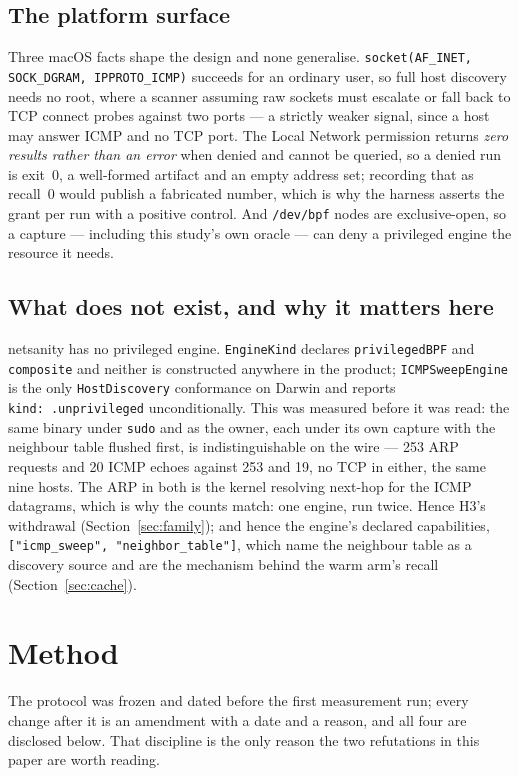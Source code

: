 \documentclass[conference]{IEEEtran}
\newcommand{\netsanity}{\textsf{netsanity}}
\begin{document}
\subsection{The platform surface}
Three macOS facts shape the design and none generalise.
\texttt{socket(AF\_INET, SOCK\_DGRAM, IP\-PROTO\_ICMP)} succeeds for an
ordinary user, so full host discovery needs no root, where a scanner assuming
raw sockets must escalate or fall back to TCP connect probes against two ports
--- a strictly weaker signal, since a host may answer ICMP and no TCP port. The
Local Network permission returns \emph{zero results rather than an error} when
denied and cannot be queried, so a denied run is exit~0, a well-formed artifact
and an empty address set; recording that as recall~0 would publish a fabricated
number, which is why the harness asserts the grant per run with a positive
control. And \texttt{/dev/bpf} nodes are exclusive-open, so a capture ---
including this study's own oracle --- can deny a privileged engine the resource
it needs.

\subsection{What does not exist, and why it matters here}
\label{sec:noengine}
\netsanity{} has no privileged engine. \texttt{EngineKind} declares
\texttt{privilegedBPF} and \texttt{composite} and neither is constructed
anywhere in the product; \texttt{ICMPSweepEngine} is the only
\texttt{HostDiscovery} conformance on Darwin and reports
\texttt{kind:\,.unprivileged} unconditionally. This was measured before it was
read: the same binary under \texttt{sudo} and as the owner, each under its own
capture with the neighbour table flushed first, is indistinguishable on the
wire --- 253 ARP requests and 20 ICMP echoes against 253 and 19, no TCP in
either, the same nine hosts. The ARP in both is the kernel resolving next-hop
for the ICMP datagrams, which is why the counts match: one engine, run twice.
Hence H3's withdrawal (Section~\ref{sec:family}); and hence the engine's
declared capabilities, \texttt{["icmp\_sweep", "neigh\-bor\_table"]}, which
name the neighbour table as a discovery source and are the mechanism behind the
warm arm's recall (Section~\ref{sec:cache}).

\section{Method}
\label{sec:method}

The protocol was frozen and dated before the first measurement run; every
change after it is an amendment with a date and a reason, and all four are
disclosed below. That discipline is the only reason the two refutations in this
paper are worth reading.
\end{document}
